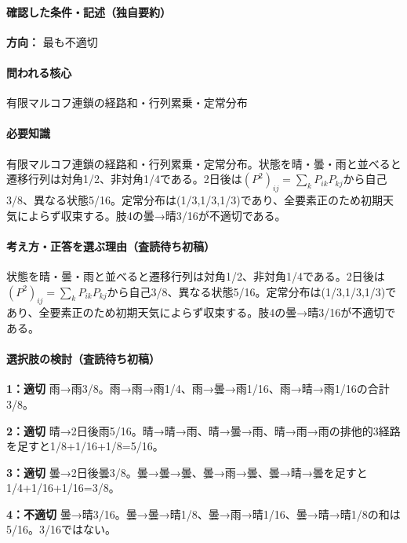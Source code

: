 \paragraph{確認した条件・記述（独自要約）}\mbox{}\par

\noindent\textbf{方向：} 最も不適切\par

\paragraph{問われる核心} 有限マルコフ連鎖の経路和・行列累乗・定常分布

\paragraph{必要知識} 有限マルコフ連鎖の経路和・行列累乗・定常分布。状態を晴・曇・雨と並べると遷移行列は対角1/2、非対角1/4である。2日後は\((P^2)_{ij}=\sum_kP_{ik}P_{kj}\)から自己3/8、異なる状態5/16。定常分布は(1/3,1/3,1/3)であり、全要素正のため初期天気によらず収束する。肢4の曇→晴3/16が不適切である。

\paragraph{考え方・正答を選ぶ理由（査読待ち初稿）} 状態を晴・曇・雨と並べると遷移行列は対角1/2、非対角1/4である。2日後は\((P^2)_{ij}=\sum_kP_{ik}P_{kj}\)から自己3/8、異なる状態5/16。定常分布は(1/3,1/3,1/3)であり、全要素正のため初期天気によらず収束する。肢4の曇→晴3/16が不適切である。

\paragraph{選択肢の検討（査読待ち初稿）}\mbox{}\par

\noindent\textbf{1：適切} 雨→雨3/8。雨→雨→雨1/4、雨→曇→雨1/16、雨→晴→雨1/16の合計3/8。\par

\noindent\textbf{2：適切} 晴→2日後雨5/16。晴→晴→雨、晴→曇→雨、晴→雨→雨の排他的3経路を足すと1/8+1/16+1/8=\allowbreak{}5/16。\par

\noindent\textbf{3：適切} 曇→2日後曇3/8。曇→曇→曇、曇→雨→曇、曇→晴→曇を足すと1/4+1/16+1/16=\allowbreak{}3/8。\par

\noindent\textbf{4：不適切} 曇→晴3/16。曇→曇→晴1/8、曇→雨→晴1/16、曇→晴→晴1/8の和は5/16。3/16ではない。\par

